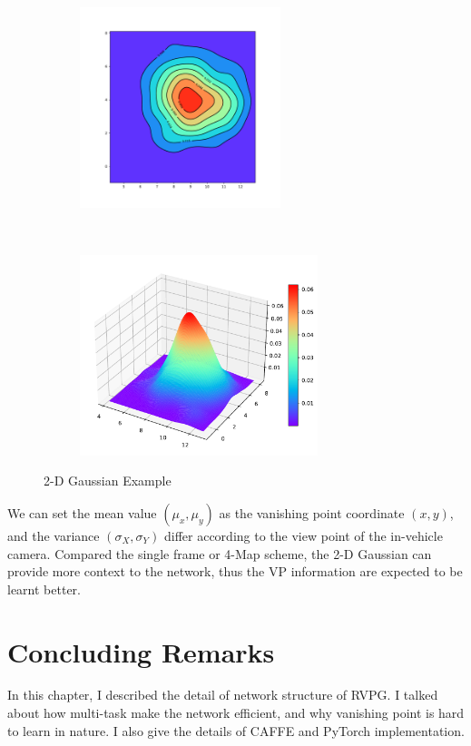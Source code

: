 \begin{spacing}{1.5}
\begin{figure}[!ht]
\begin{adjustbox}{minipage=0.98\linewidth,fbox}
    \centering
    \begin{subfigure}[b]{0.49\textwidth}
        \centering
        \includegraphics[height=2.3in]{Chapter3/gaussian2d.pdf}
    \end{subfigure}%
    ~
    \begin{subfigure}[b]{0.49\textwidth}
        \centering
        \includegraphics[height=2.3in]{Chapter3/gaussian3d.pdf}
    \end{subfigure}
\end{adjustbox}
\caption{2-D Gaussian Example}
\label{fig:2dgaussian}
\end{figure}

We can set the mean value $(\mu_x,\mu_y)$ as the vanishing point coordinate $(x,y)$, and the variance $(\sigma_X,\sigma_Y)$ differ according to the view point of the in-vehicle camera. Compared the single frame or 4-Map scheme, the 2-D Gaussian can provide more context to the network, thus the VP information are expected to be learnt better.

\section{Concluding Remarks}

In this chapter, I described the detail of network structure of RVPG. I talked about how multi-task make the network efficient, and why vanishing point is hard to learn in nature. I also give the details of CAFFE and PyTorch implementation.


\end{spacing}
